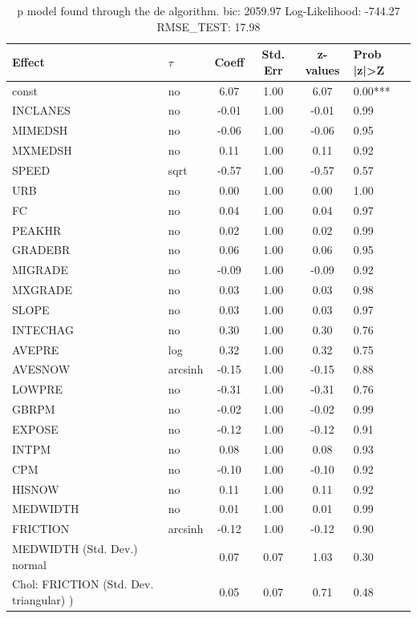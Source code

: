 \begin{table}
	\caption{p model found through the de algorithm. bic: 2059.97 Log-Likelihood: -744.27 RMSE_TEST: 17.98}
	\begin{center}
		\begin{tabular}{|l|l|c|c|c|l|}
			\hline
			Effect & $\tau$ & Coeff & Std. Err & z-values & Prob |z|>Z \\
			\hline
			const & no & 6.07 & 1.00 & 6.07 & 0.00*** \\
			\hline
			INCLANES & no & -0.01 & 1.00 & -0.01 & 0.99 \\
			\hline
			MIMEDSH & no & -0.06 & 1.00 & -0.06 & 0.95 \\
			\hline
			MXMEDSH & no & 0.11 & 1.00 & 0.11 & 0.92 \\
			\hline
			SPEED & sqrt & -0.57 & 1.00 & -0.57 & 0.57 \\
			\hline
			URB & no & 0.00 & 1.00 & 0.00 & 1.00 \\
			\hline
			FC & no & 0.04 & 1.00 & 0.04 & 0.97 \\
			\hline
			PEAKHR & no & 0.02 & 1.00 & 0.02 & 0.99 \\
			\hline
			GRADEBR & no & 0.06 & 1.00 & 0.06 & 0.95 \\
			\hline
			MIGRADE & no & -0.09 & 1.00 & -0.09 & 0.92 \\
			\hline
			MXGRADE & no & 0.03 & 1.00 & 0.03 & 0.98 \\
			\hline
			SLOPE & no & 0.03 & 1.00 & 0.03 & 0.97 \\
			\hline
			INTECHAG & no & 0.30 & 1.00 & 0.30 & 0.76 \\
			\hline
			AVEPRE & log & 0.32 & 1.00 & 0.32 & 0.75 \\
			\hline
			AVESNOW & arcsinh & -0.15 & 1.00 & -0.15 & 0.88 \\
			\hline
			LOWPRE & no & -0.31 & 1.00 & -0.31 & 0.76 \\
			\hline
			GBRPM & no & -0.02 & 1.00 & -0.02 & 0.99 \\
			\hline
			EXPOSE & no & -0.12 & 1.00 & -0.12 & 0.91 \\
			\hline
			INTPM & no & 0.08 & 1.00 & 0.08 & 0.93 \\
			\hline
			CPM & no & -0.10 & 1.00 & -0.10 & 0.92 \\
			\hline
			HISNOW & no & 0.11 & 1.00 & 0.11 & 0.92 \\
			\hline
			MEDWIDTH & no & 0.01 & 1.00 & 0.01 & 0.99 \\
			\hline
			FRICTION & arcsinh & -0.12 & 1.00 & -0.12 & 0.90 \\
			\hline
			MEDWIDTH (Std. Dev.) normal &  & 0.07 & 0.07 & 1.03 & 0.30 \\
			\hline
			 Chol: FRICTION (Std. Dev. triangular) ) &  & 0.05 & 0.07 & 0.71 & 0.48 \\
			\hline
		\end{tabular}
	\end{center}
\end{table}